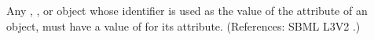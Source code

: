 Any \Compartment, \Species, \Parameter or \SpeciesReference object whose
identifier is used as the value of the attribute  of an
\EventAssignment object, must have a value of  for its
 attribute.  (References: SBML L3V2
.)
